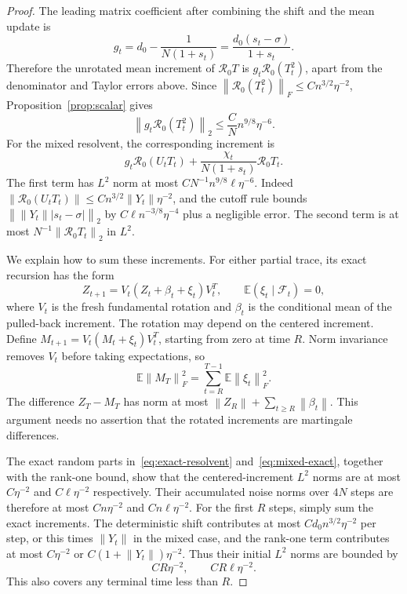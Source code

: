\documentclass[10pt,a4paper]{amsart}
\newcommand{\E}{\mathbb E}
\newcommand{\R}{\mathcal R}
\newcommand{\norm}[1]{\left\lVert#1\right\rVert}
\begin{document}
\begin{proof}
The leading matrix coefficient after combining the shift and the mean update is
\begin{equation}\label{eq:gcoef}
 g_t=d_0-\frac1{N(1+s_t)}
     =\frac{d_0(s_t-\sigma)}{1+s_t}.
\end{equation}
Therefore the unrotated mean increment of $\R_0T$ is
$g_t\R_0(T_t^2)$, apart from the denominator and Taylor errors above. Since
$\norm{\R_0(T_t^2)}_F\le Cn^{3/2}\eta^{-2}$,
Proposition~\ref{prop:scalar} gives
\begin{equation}\label{eq:leading-T}
 \norm{g_t\R_0(T_t^2)}_2
 \le \frac C N n^{9/8}\eta^{-6}.
\end{equation}
For the mixed resolvent, the corresponding increment is
\begin{equation}\label{eq:leading-U-form}
 g_t\R_0(U_tT_t)+\frac{\chi_t}{N(1+s_t)}\R_0T_t.
\end{equation}
The first term has $L^2$ norm at most
$C N^{-1}n^{9/8}\ell\eta^{-6}$.
Indeed $\norm{\R_0(U_tT_t)}\le Cn^{3/2}\norm{Y_t}\eta^{-2}$, and the cutoff rule bounds
$\norm{\norm{Y_t}|s_t-\sigma|}_2$ by
$C\ell n^{-3/8}\eta^{-4}$ plus a negligible error.
The second term is at most $N^{-1}\norm{\R_0T_t}_2$ in $L^2$.

We explain how to sum these increments. For either partial trace, its exact recursion has the form
\[
 Z_{t+1}=V_t(Z_t+\beta_t+\xi_t)V_t^T,
 \qquad \E(\xi_t\mid\mathcal F_t)=0,
\]
where $V_t$ is the fresh fundamental rotation and $\beta_t$ is the conditional mean of the pulled-back increment. The rotation may depend on the centered increment. Define
$M_{t+1}=V_t(M_t+\xi_t)V_t^T$, starting from zero at time $R$. Norm invariance removes $V_t$ before taking expectations, so
\[
 \E\norm{M_T}_F^2=\sum_{t=R}^{T-1}\E\norm{\xi_t}_F^2.
\]
The difference $Z_T-M_T$ has norm at most
$\norm{Z_R}+\sum_{t\ge R}\norm{\beta_t}$.
This argument needs no assertion that the rotated increments are martingale differences.

The exact random parts in~\eqref{eq:exact-resolvent} and~\eqref{eq:mixed-exact}, together with the rank-one bound, show that the centered-increment $L^2$ norms are at most
$C\eta^{-2}$ and $C\ell\eta^{-2}$ respectively. Their accumulated noise norms over $4N$ steps are therefore at most $Cn\eta^{-2}$ and $Cn\ell\eta^{-2}$.
For the first $R$ steps, simply sum the exact increments. The deterministic shift contributes at most $C d_0n^{3/2}\eta^{-2}$ per step, or this times $\norm{Y_t}$ in the mixed case, and the rank-one term contributes at most $C\eta^{-2}$ or $C(1+\norm{Y_t})\eta^{-2}$. Thus their initial $L^2$ norms are bounded by
\begin{equation}\label{eq:initial-matrix}
 CR\eta^{-2},\qquad CR\ell\eta^{-2}.
\end{equation}
This also covers any terminal time less than $R$.



\end{proof}
\end{document}
